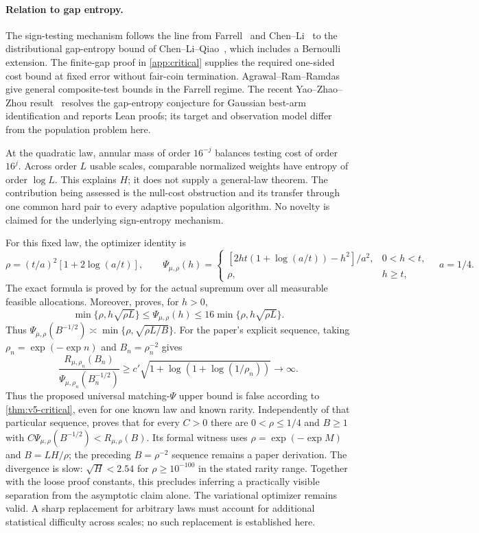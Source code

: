 \paragraph{Relation to gap entropy.}
The sign-testing mechanism follows the line from Farrell~\cite{farrell}
and Chen--Li~\cite{chenli} to the distributional gap-entropy bound of
Chen--Li--Qiao~\cite[Lemma 4.1 and Remark D.4]{clq}, which includes a
Bernoulli extension. The finite-gap proof in \cref{app:critical} supplies
the required one-sided cost bound at fixed error without fair-coin
termination. Agrawal--Ram--Ramdas~\cite{agrawal} give general
composite-test bounds in the Farrell regime. The recent
Yao--Zhao--Zhou result~\cite{yao} resolves the gap-entropy conjecture for
Gaussian best-arm identification and reports Lean proofs; its target and
observation model differ from the population problem here.

At the quadratic law, annular mass of order $16^{-j}$ balances testing
cost of order $16^j$. Across order $L$ usable scales, comparable
normalized weights have entropy of order $\log L$. This explains $H$;
it does not supply a general-law theorem. The contribution being assessed
is the null-cost obstruction and its transfer through one common hard
pair to every adaptive population algorithm. No novelty is claimed for
the underlying sign-entropy mechanism.

For this fixed law, the optimizer identity is
\[
 \rho=(t/a)^2[1+2\log(a/t)],\qquad
 \Psi_{\mu,\rho}(h)=
 \begin{cases}
 [2ht(1+\log(a/t))-h^2]/a^2,&0<h<t,\\
 \rho,&h\ge t,
 \end{cases}
 \quad a=1/4.
\]
The exact formula is proved by
 for the actual supremum
over all measurable feasible allocations. Moreover,
 proves, for $h>0$,
\[
 \min\{\rho,h\sqrt{\rho L}\}\le\Psi_{\mu,\rho}(h)
 \le16\min\{\rho,h\sqrt{\rho L}\}.
\]
Thus $\Psi_{\mu,\rho}(B^{-1/2})\asymp\min\{\rho,\sqrt{\rho L/B}\}$.
For the paper's explicit sequence, taking $\rho_n=\exp(-\exp n)$ and $B_n=\rho_n^{-2}$ gives
\[
 \frac{R_{\mu,\rho_n}(B_n)}
      {\Psi_{\mu,\rho_n}(B_n^{-1/2})}
 \ge c'\sqrt{1+\log(1+\log(1/\rho_n))}\longrightarrow\infty.
\]
Thus the proposed universal matching-$\Psi$ upper bound is false
according to \cref{thm:v5-critical}, even for one known law and known
rarity. Independently of that particular sequence,
 proves that
for every $C>0$ there are $0<\rho\le1/4$ and $B\ge1$ with
$C\Psi_{\mu,\rho}(B^{-1/2})<R_{\mu,\rho}(B)$.
Its formal witness uses $\rho=\exp(-\exp M)$ and $B=LH/\rho$;
the preceding $B=\rho^{-2}$ sequence remains a paper derivation.
The divergence is slow: $\sqrt H<2.54$ for $\rho\ge10^{-100}$ in the
stated rarity range. Together with the loose proof constants, this
precludes inferring a practically visible separation from the asymptotic
claim alone.
The variational optimizer remains valid. A sharp replacement
for arbitrary laws must account for additional statistical difficulty
across scales; no such replacement is established here.

